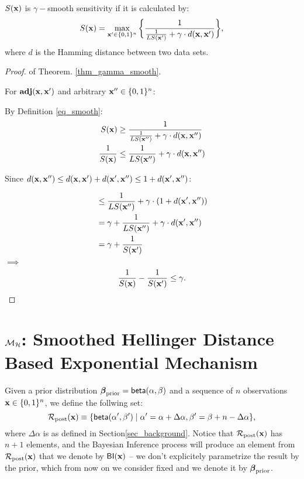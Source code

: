 \documentclass{article}
\begin{document}
\begin{thm}
\label{thm_gamma_smooth}
$S(\textbf{x})$ is $\gamma -$smooth sensitivity if it is calculated by:
\begin{equation}
  \label{eq_smooth}
   S(\textbf{x})=\max_{\textbf{x}' \in \{0,1\}^{n}}\bigg \{ \frac{1}{\frac{1}{LS(\textbf{x}')} +\gamma \cdot d(\textbf{x},\textbf{x}')} \bigg \},
\end{equation}
where $d$ is the Hamming distance between two data sets.
\end{thm}

\begin{proof}
of Theorem. \ref{thm_gamma_smooth}.

For $\textbf{adj}(\textbf{x},\textbf{x}')$ and arbitrary $\textbf{x}'' \in \{0,1\}^{n}$:

By Definition \ref{eq_smooth}:
\begin{equation*}
\begin{split}
S(\textbf{x}) 
& \geq \frac{1}{\frac{1}{LS(\textbf{x}'')} +\gamma \cdot d(\textbf{x},\textbf{x}'')}\\
\frac{1}{S(\textbf{x})} 
& \leq \frac{1}{LS(\textbf{x}'')} +\gamma \cdot d(\textbf{x},\textbf{x}'')\\
\end{split}
\end{equation*}

Since $d(\textbf{x},\textbf{x}'') \leq d(\textbf{x},\textbf{x}') + d(\textbf{x}',\textbf{x}'') \leq 1 + d(\textbf{x}',\textbf{x}'')$:

\begin{equation*}
\begin{split}
& \leq \frac{1}{LS(\textbf{x}'')} +\gamma \cdot (1 + d(\textbf{x}',\textbf{x}''))\\
& = \gamma + \frac{1}{LS(\textbf{x}'')} +\gamma \cdot d(\textbf{x}',\textbf{x}'')\\
& = \gamma + \frac{1}{S(\textbf{x}')}
\end{split}
\end{equation*}
$\implies$
\begin{equation*}
\frac{1}{S(\textbf{x})} - \frac{1}{S(\textbf{x}')} \leq \gamma.
\end{equation*}

\end{proof}



\section{$\mathcal{M}_{\mathcal{H}}$: Smoothed Hellinger Distance Based Exponential Mechanism}
\label{sec_mechs}
Given a prior distribution $\boldsymbol{\beta}_{\textup{prior}} = \mathsf{beta}(\alpha, \beta)$ and a sequence of $n$ observations $\textbf{x}\in\{0,1\}^n$, we define the follwing set:
\[
  \mathcal{R}_{\textup{post}}(\textbf{x}) \equiv\{\mathsf{beta}(\alpha',\beta')\mid \alpha'=\alpha+\Delta\alpha, \beta'=\beta+n-\Delta\alpha\},
\]
where $\Delta\alpha$ is as defined in Section\ref{sec_background}.
Notice that $\mathcal{R}_{\textup{post}}(\textbf{x})$ has $n + 1$ elements, and
the Bayesian Inference process will produce an element from $\mathcal{R}_{\textup{post}}(\textbf{x})$
that we denote by $\mathsf{BI}(\textbf{x})$ -- we don't explicitely
parametrize the result by the prior, which from now on we consider
fixed and we denote it by $\boldsymbol{\beta}_{\textup{prior}}$.
\end{document}
